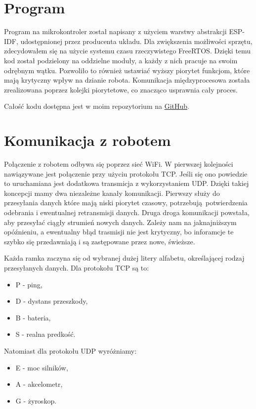 \documentclass[10pt, a4paper]{article}
\begin{document}
\section{Program}
Program na mikrokontroler został napisany z użyciem warstwy abstrakcji
ESP-IDF, udostępnionej przez producenta układu. Dla zwiększenia 
możliwości sprzętu, zdecydowałem się na użycie systemu czasu rzeczywistego
FreeRTOS. Dzięki temu kod został podzielony na oddzielne moduły, 
a każdy z nich pracuje na swoim odrębnym wątku. Pozwoliło to również
ustawiać wyższy piorytet funkcjom, które mają krytyczny wpływ na dzianie robota.
Komunikacja międzyprocesowa została zrealizowana poprzez kolejki piorytetowe,
co znacząco usprawnia cały proces.

Całość kodu dostępna jest w moim repozytorium na
\href{https://github.com/mbober1/ReTank}{GitHub}.

\section{Komunikacja z robotem}

Połączenie z robotem odbywa się poprzez sieć WiFi. W pierwszej kolejności 
nawiązywane jest połączenie przy użyciu protokołu TCP. Jeśli się ono powiedzie
to uruchamiana jest dodatkowa transmicja z wykorzystaniem UDP. 
Dzięki takiej koncepcji mamy dwa niezależne kanały komunikacji. Pierwszy służy
do przesyłania danych które mają niski piorytet czasowy, potrzebują potwierdzenia
odebrania i ewentualnej retransmisji danych. Druga droga komunikacji powstała, 
aby przesyłać ciągły strumień nowych danych. Zależy nam na jaknajniższym opóźnieniu,
a ewentualny błąd trasmisji nie jest krytyczny, bo inforamcje te szybko się 
przedawniają i są zastępowane przez nowe, świeższe. \newline

Każda ramka zaczyna się od wybranej dużej litery alfabetu, określającej rodzaj 
przesyłanych danych. Dla protokołu TCP są to:

	\begin{itemize}
	  \item P - ping,
	  \item D - dystans przeszkody,
	  \item B - bateria,
	  \item S - realna predkość.
	\end{itemize}
	
Natomiast dla protokołu UDP wyróżniamy:
  \begin{itemize}
	\item E - moc silników,
	\item A - akcelometr,
	\item G - żyroskop.
  \end{itemize}
\end{document}
